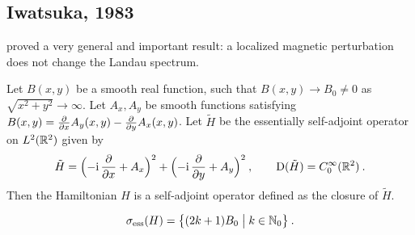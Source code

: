 \subsection{Iwatsuka, 1983}
\cite{Iwatsuka1983} proved a very general and important result: a localized magnetic perturbation does not change the Landau spectrum.
\begin{defn}
    Let $B(x, y)$ be a smooth real function, such that $B(x, y) \to B_0 \neq 0$ as $\sqrt{x^2 + y^2} \to \infty$. Let $A_x, A_y$ be smooth functions satisfying $B(x,y) = \frac{\partial }{\partial x} A_y(x,y) - \frac{\partial }{\partial y} A_x(x,y)$. Let $\tilde H$ be the essentially self-adjoint operator on $L^2(\mathbb{R}^2)$ given by
    \begin{gather*}
        \tilde H
        = \Big( {-\mathrm{i}} \, \frac{\partial }{\partial x} + A_x \Big)^2
        + \Big( {-\mathrm{i}} \, \frac{\partial }{\partial y} + A_y \Big)^2
        \: , \qquad
        \mathrm{D}(\tilde H) = C_0^\infty(\mathbb{R}^2)
        \: .
    \end{gather*}
    Then the Hamiltonian $H$ is a self-adjoint operator defined as the closure of $\tilde H$.
\end{defn}
\begin{thm}[Spectrum of $H$] \label{thm-Iwatsuka-unperturb}
    $$
        \sigma_{\mathrm{ess}}(H) = \big\{ (2k + 1) B_0  \;\big|\; k \in \mathbb{N}_0 \big\}
        \: .
    $$
\end{thm}

